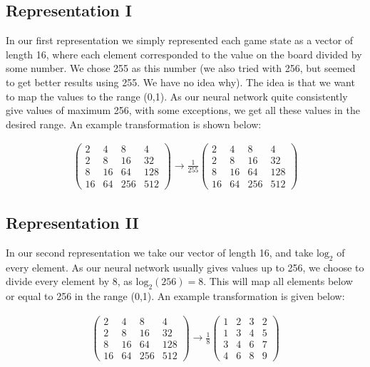 \documentclass[11pt,a4paper]{article}
\begin{document}
\subsection*{Representation I}
In our first representation we simply represented each game state as a vector of length 16, where each element corresponded to the value on the board divided by some number. We chose 255 as this number (we also tried with 256, but seemed to get better results using 255. We have no idea why). The idea is that we want to map the values to the range (0,1). As our neural network quite consistently give values of maximum 256, with some exceptions, we get all these values in the desired range. An example transformation is shown below:

\begin{align*}
\begin{pmatrix}
  2  &  4 &   8 &  4\\
  2  &  8 &  16 & 32 \\
  8  & 16 &  64 & 128 \\
  16 & 64 & 256 & 512
\end{pmatrix}
\rightarrow
\frac{1}{255}
\begin{pmatrix}
  2  &  4 &   8 &  4\\
  2  &  8 &  16 & 32 \\
  8  & 16 &  64 & 128 \\
  16 & 64 & 256 & 512
\end{pmatrix}
\end{align*}

\subsection*{Representation II}
In our second representation we take our vector of length 16, and take $\textrm{log}_2$ of every element. As our neural network usually gives values up to 256, we choose to divide every element by 8, as $\textrm{log}_2(256) = 8$. This will map all elements below or equal to 256 in the range (0,1). An example transformation is given below:

\begin{align*}
\begin{pmatrix}
  2  &  4 &   8 &  4\\
  2  &  8 &  16 & 32 \\
  8  & 16 &  64 & 128 \\
  16 & 64 & 256 & 512
\end{pmatrix}
\rightarrow
\frac{1}{8}
\begin{pmatrix}
  1 & 2 & 3 & 2 \\
  1 & 3 & 4 & 5 \\
  3 & 4 & 6 & 7 \\
  4 & 6 & 8 & 9
\end{pmatrix}
\end{align*}
\end{document}
